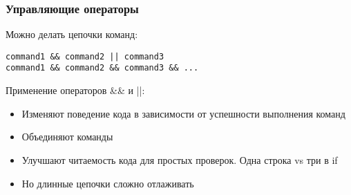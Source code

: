 \begin{frame}[fragile]
\frametitle{Управляющие операторы}
Можно делать цепочки команд:
\begin{verbatim}
command1 && command2 || command3 
command1 && command2 && command3 && ...
\end{verbatim}

Применение операторов \&\& и ||:
\begin{itemize}
    \item Изменяют поведение кода в зависимости от успешности выполнения команд
    \item Объединяют команды
    \item Улучшают читаемость кода для простых проверок.  Одна строка vs три в if
    \item Но длинные цепочки сложно отлаживать
\end{itemize}

\end{frame}

